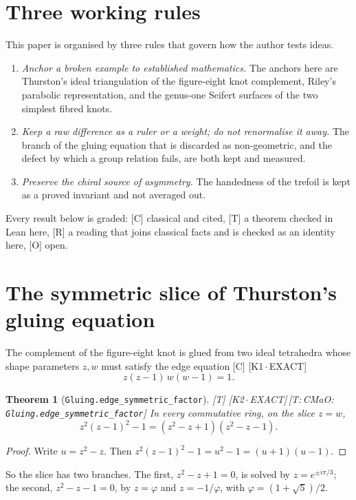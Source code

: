 \documentclass[11pt]{article}
\newtheorem{theorem}{Theorem}
\theoremstyle{definition}
\newcommand{\grade}[1]{\textsf{\small[#1]}}
\newcommand{\lean}[1]{\texttt{\small #1}}
\newcommand{\dtag}[1]{#1}
\begin{document}
\section{Three working rules}
This paper is organised by three rules that govern how the author tests ideas.
\begin{enumerate}[leftmargin=2em]
\item \emph{Anchor a broken example to established mathematics.} The anchors here are Thurston's ideal triangulation of the figure-eight knot complement, Riley's parabolic representation, and the genus-one Seifert surfaces of the two simplest fibred knots.
\item \emph{Keep a raw difference as a ruler or a weight; do not renormalise it away.} The branch of the gluing equation that is discarded as non-geometric, and the defect by which a group relation fails, are both kept and measured.
\item \emph{Preserve the chiral source of asymmetry.} The handedness of the trefoil is kept as a proved invariant and not averaged out.
\end{enumerate}
Every result below is graded: \grade{C} classical and cited, \grade{T} a theorem checked in Lean here, \grade{R} a reading that joins classical facts and is checked as an identity here, \grade{O} open.

\section{The symmetric slice of Thurston's gluing equation}
The complement of the figure-eight knot is glued from two ideal tetrahedra whose shape parameters $z,w$ must satisfy the edge equation \grade{C} \cite{Thurston}\dtag{ \textsf{\small[K1\,$\cdot$\,EXACT]}}
\begin{equation}\label{eq:edge}
z(z-1)\,w(w-1)=1 .
\end{equation}

\begin{theorem}[\lean{Gluing.edge\_symmetric\_factor}]\grade{T}\dtag{ \textsf{\small[K2\,$\cdot$\,EXACT]}\,\textsf{\small[T:\,CMaO:\,\lean{Gluing.\allowbreak{}edge\_\allowbreak{}symmetric\_\allowbreak{}factor}]}}
In every commutative ring, on the slice $z=w$,
\[ z^2(z-1)^2-1=(z^2-z+1)(z^2-z-1). \]
\end{theorem}
\begin{proof}
Write $u=z^2-z$. Then $z^2(z-1)^2-1=u^2-1=(u+1)(u-1)$.
\end{proof}

So the slice has two branches. The first, $z^2-z+1=0$, is solved by $z=e^{\pm i\pi/3}$; the second, $z^2-z-1=0$, by $z=\varphi$ and $z=-1/\varphi$, with $\varphi=(1+\sqrt5)/2$.
\end{document}
